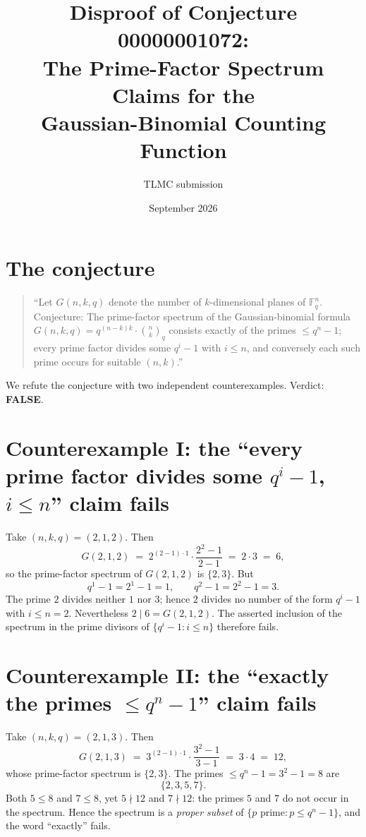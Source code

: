 \documentclass[11pt]{article}
\title{Disproof of Conjecture 00000001072:\\
The Prime-Factor Spectrum Claims for the\\
Gaussian-Binomial Counting Function}
\author{TLMC submission}
\date{September 2026}
\begin{document}
\maketitle

\section{The conjecture}

\begin{quote}
``Let $G(n,k,q)$ denote the number of $k$-dimensional planes of $\mathbb{F}_q^n$.
Conjecture: The prime-factor spectrum of the Gaussian-binomial formula
$G(n,k,q) = q^{(n-k)k}\cdot \binom{n}{k}_q$ consists exactly of the primes
$\le q^n - 1$; every prime factor divides some $q^i - 1$ with $i \le n$, and
conversely each such prime occurs for suitable $(n,k)$.''
\end{quote}

We refute the conjecture with two independent counterexamples. Verdict: \textbf{FALSE}.

\section{Counterexample I: the ``every prime factor divides some $q^i-1$, $i\le n$'' claim fails}

Take $(n,k,q) = (2,1,2)$. Then
\[
G(2,1,2) \;=\; 2^{(2-1)\cdot 1}\cdot\frac{2^2-1}{2-1} \;=\; 2\cdot 3 \;=\; 6,
\]
so the prime-factor spectrum of $G(2,1,2)$ is $\{2,3\}$. But
\[
q^1 - 1 = 2^1 - 1 = 1, \qquad q^2 - 1 = 2^2 - 1 = 3.
\]
The prime $2$ divides neither $1$ nor $3$; hence $2$ divides no number of the
form $q^i - 1$ with $i \le n = 2$. Nevertheless $2 \mid 6 = G(2,1,2)$.
The asserted inclusion of the spectrum in the prime divisors of
$\{q^i-1 : i \le n\}$ therefore fails.

\section{Counterexample II: the ``exactly the primes $\le q^n-1$'' claim fails}

Take $(n,k,q) = (2,1,3)$. Then
\[
G(2,1,3) \;=\; 3^{(2-1)\cdot 1}\cdot\frac{3^2-1}{3-1} \;=\; 3\cdot 4 \;=\; 12,
\]
whose prime-factor spectrum is $\{2,3\}$. The primes $\le q^n - 1 = 3^2 - 1 = 8$ are
\[
\{2,3,5,7\}.
\]
Both $5 \le 8$ and $7 \le 8$, yet $5 \nmid 12$ and $7 \nmid 12$: the primes $5$
and $7$ do not occur in the spectrum. Hence the spectrum is a \emph{proper
subset} of $\{p \text{ prime} : p \le q^n-1\}$, and the word ``exactly'' fails.
\end{document}
